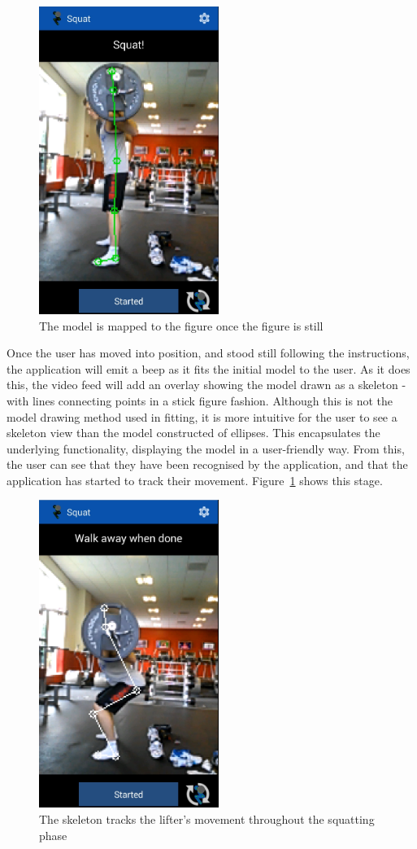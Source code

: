 \begin{figure}[H]
    \centering
	\includegraphics[height=10cm]{application/images/startsquatting}
\caption{The model is mapped to the figure once the figure is still}
\label{fig:startsquatting}
\end{figure}

Once the user has moved into position, and stood still following the instructions, the application will emit a beep as it fits the initial model to the user. As it does this, the video feed will add an overlay showing the model drawn as a skeleton - with lines connecting points in a stick figure fashion. Although this is not the model drawing method used in fitting, it is more intuitive for the user to see a skeleton view than the model constructed of ellipses. This encapsulates the underlying functionality, displaying the model in a user-friendly way. From this, the user can see that they have been recognised by the application, and that the application has started to track their movement. Figure~\ref{fig:startsquatting} shows this stage.

\begin{figure}[H]
    \centering
	\includegraphics[height=10cm]{application/images/midsquat}
\caption{The skeleton tracks the lifter's movement throughout the squatting phase}
\label{fig:midsquat}
\end{figure}

